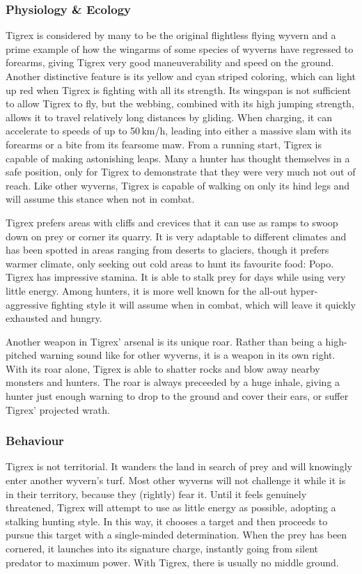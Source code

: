 \subsubsection{Physiology \& Ecology}
Tigrex is considered by many to be the original flightless flying wyvern and a prime example of how the wingarms of some species of wyverns have regressed to forearms, giving Tigrex very good maneuverability and speed on the ground. Another distinctive feature is its yellow and cyan striped coloring, which can light up red when Tigrex is fighting with all its strength. Its wingspan is not sufficient to allow Tigrex to fly, but the webbing, combined with its high jumping strength, allows it to travel relatively long distances by gliding. When charging, it can accelerate to speeds of up to 50\,km/h, leading into either a massive slam with its forearms or a bite from its fearsome maw. From a running start, Tigrex is capable of making astonishing leaps. Many a hunter has thought themselves in a safe position, only for Tigrex to demonstrate that they were very much not out of reach. Like other wyverns, Tigrex is capable of walking on only its hind legs and will assume this stance when not in combat.

Tigrex prefers areas with cliffs and crevices that it can use as ramps to swoop down on prey or corner its quarry. It is very adaptable to different climates and has been spotted in areas ranging from deserts to glaciers, though it prefers warmer climate, only seeking out cold areas to hunt its favourite food: Popo. Tigrex has impressive stamina. It is able to stalk prey for days while using very little energy. Among hunters, it is more well known for the all-out hyper-aggressive fighting style it will assume when in combat, which will leave it quickly exhausted and hungry.

Another weapon in Tigrex' arsenal is its unique roar. Rather than being a high-pitched warning sound like for other wyverns, it is a weapon in its own right. With its roar alone, Tigrex is able to shatter rocks and blow away nearby monsters and hunters. The roar is always preceeded by a huge inhale, giving a hunter just enough warning to drop to the ground and cover their ears, or suffer Tigrex' projected wrath.

\subsubsection{Behaviour}
Tigrex is not territorial. It wanders the land in search of prey and will knowingly enter another wyvern's turf. Most other wyverns will not challenge it while it is in their territory, because they (rightly) fear it. Until it feels genuinely threatened, Tigrex will attempt to use as little energy as possible, adopting a stalking hunting style. In this way, it chooses a target and then proceeds to pursue this target with a single-minded determination. When the prey has been cornered, it launches into its signature charge, instantly going from silent predator to maximum power. With Tigrex, there is usually no middle ground.

